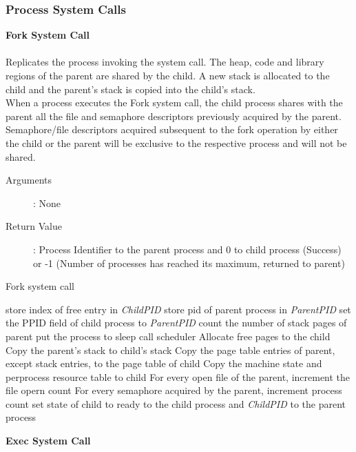 \documentclass[10pt]{article}
\begin{document}
\subsubsection{Process System Calls}
\textbf{Fork System Call}
\\ \\
Replicates the process invoking the system call. The heap, code and library regions of the parent are shared by the child. A new stack is allocated to the child and the parent's stack is copied into the child's stack.
\\
When a process executes the Fork system call, the child process shares with the parent all the file and semaphore descriptors previously acquired by the parent. Semaphore/file descriptors acquired subsequent to the fork operation by either the child or the parent will be exclusive to the respective process and will not be shared.
\begin{description}
\item[Arguments]: None
\item[Return Value]: Process Identifier to the parent process and 0 to child process (Success) or -1 (Number of processes has reached its maximum, returned to parent)
\end{description} 
\begin{algorithm}
\caption{Fork system call}
\begin{algorithmic}
\ELSE
    \STATE store index of free entry in \textit{ChildPID}
    \STATE store pid of parent process in \textit{ParentPID}
\ENDIF
\STATE set the PPID field of child process to \textit{ParentPID}
\STATE count the number of stack pages of parent
    \STATE put the process to sleep
    \STATE call scheduler
\ENDWHILE
\STATE Allocate free pages to the child
\STATE Copy the parent's stack to child's stack
\STATE Copy the page table entries of parent, except stack entries, to the page table of child
\STATE Copy the machine state and per\-process resource table to child
\STATE For every open file of the parent, increment the file opern count
\STATE For every semaphore acquired by the parent, increment process count
\STATE set state of child to ready
 to the child process and \textit{ChildPID} to the parent process
\end{algorithmic}
\end{algorithm}
\vspace{22mm}
\textbf{Exec System Call}
\\ \\
\end{document}
